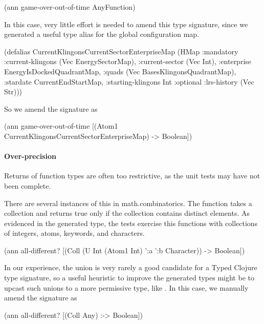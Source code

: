 \begin{cljlisting}
(ann game-over-out-of-time AnyFunction)
\end{cljlisting}

In this case, very little effort is needed to amend this
type signature, since we generated a useful type alias
for the global configuration map.

\begin{cljlisting}
(defalias CurrentKlingonsCurrentSectorEnterpriseMap
  (HMap :mandatory
    {:current-klingons (Vec EnergySectorMap),
     :current-sector (Vec Int), 
     :enterprise EnergyIsDockedQuadrantMap,
     :quads (Vec BasesKlingonsQuadrantMap), 
     :stardate CurrentEndStartMap,
     :starting-klingons Int}
    :optional {:lrs-history (Vec Str)}))
\end{cljlisting}

So we amend the signature as

\begin{cljlisting}
(ann game-over-out-of-time
  [(Atom1 CurrentKlingonsCurrentSectorEnterpriseMap) 
   -> Boolean])
\end{cljlisting}


\paragraph{Over-precision}
Returns of function types are often too restrictive, as the unit
tests may have not been complete.

There are several instances of this in math.combinatorics.
The  function
takes a collection and returns true only if the collection
contains distinct elements.
As evidenced in the generated type, the tests exercise
this functions with collections of integers, atoms,
keywords, and characters.

\begin{cljlisting}
(ann all-different?
  [(Coll (U Int (Atom1 Int) ':a ':b Character)) 
   -> Boolean])
\end{cljlisting}

In our experience, the union is very rarely a good candidate
for a Typed Clojure type signature, so a useful heuristic to improve
the generated types might be to upcast such unions to a more permissive
type, like . 
In this case, we manually amend the signature as

\begin{cljlisting}
(ann all-different? [(Coll Any) :-> Boolean])
\end{cljlisting}

